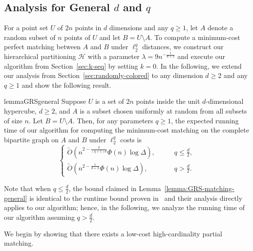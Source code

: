 \documentclass[11pt,onecolumn]{article}
\def\mcH{{\mathcal{H}}}
\begin{document}
\subsection{Analysis for General \texorpdfstring{$d$}{} and \texorpdfstring{$q$}{}}\label{sec:appendix-GRS}
For a point set $U$ of $2n$ points in $d$ dimensions and any $q\ge 1$, let $A$ denote a random subset of $n$ points of $U$ and let $B=U\setminus A$. 
To compute a minimum-cost perfect matching between $A$ and $B$ under $\ell_2^q$ distances, we construct our hierarchical partitioning $\mcH$ with a parameter $\lambda=9n^{-\frac{1}{d+2}}$ and execute our algorithm from Section~\ref{sec:k-seq} by setting $k=0$. In the following, we extend our analysis from Section~\ref{sec:randomly-colored} to any dimension $d\ge 2$ and any $q\ge 1$ and show the following result.


\begin{restatable}{lemma}{GRSgeneral}\label{lemma:GRS-matching-general}
    Suppose $U$ is a set of $2n$ points inside the unit $d$-dimensional hypercube, $d\ge 2$, and $A$ is a subset chosen uniformly at random from all subsets of size $n$. Let $B=U\setminus A$. Then, for any parameters $q\ge 1$, the expected running time of our algorithm for computing the minimum-cost matching on the complete bipartite graph on $A$ and $B$ under $\ell_2^q$ costs is
    \begin{equation*}
    \begin{cases}
        \tilde{O}(n^{2-\frac{q}{(q+1)d}}\Phi(n)\log \Delta),\qquad &q\le\frac{d}{2},\\
        \tilde{O}(n^{2-\frac{1}{d+2}}\Phi(n)\log \Delta),\qquad &q>\frac{d}{2}.
    \end{cases}
\end{equation*}
\end{restatable}

%
Note that when $q\le \frac{d}{2}$, the bound claimed in Lemma~\ref{lemma:GRS-matching-general} is identical to the runtime bound proven in~\cite[Theorem B.2]{gattani2023robust} and their analysis directly applies to our algorithm; hence, in the following, we analyze the running time of our algorithm assuming $q>\frac{d}{2}$.

We begin by showing that there exists a low-cost high-cardinality partial matching.
\end{document}
